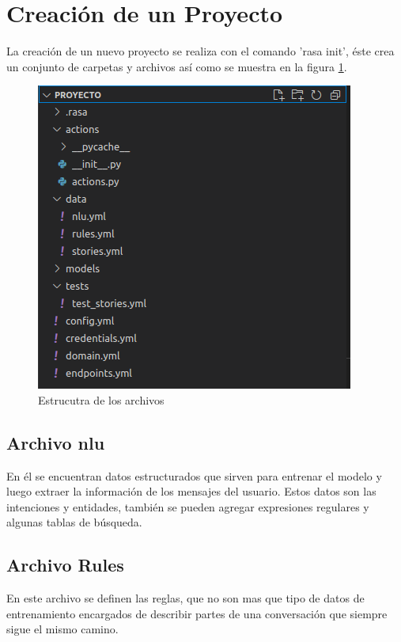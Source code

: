 \section{Creación de un Proyecto}
\indent La creación de un nuevo proyecto se realiza con el comando 'rasa init', éste crea un conjunto de carpetas y archivos así como se muestra en la figura \ref{fig:Estructura}.
\begin{figure}[h]
    \centering
    \includegraphics[width=\textwidth]{imagenes/cap3/4_Estructura del Proyecto.png}
    \caption{Estrucutra de los archivos}
    \label{fig:Estructura}
\end{figure}
\subsection{Archivo nlu}
En él se encuentran datos estructurados que sirven para entrenar el modelo y luego extraer la información de los mensajes del usuario. Estos datos son  las intenciones y entidades, también se pueden agregar expresiones regulares y algunas tablas de búsqueda. \cite{NLU_Documentation}

\subsection{Archivo Rules}
En este archivo se definen las reglas, que no son mas que  tipo de datos de entrenamiento encargados de describir partes de una conversación que siempre sigue el mismo camino.\cite{Rules_Documentation}

